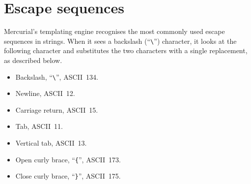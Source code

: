 
\section{Escape sequences}
\label{sec:template:escape}

Mercurial's templating engine recognises the most commonly used escape
sequences in strings.  When it sees a backslash (``\Verb+\+'')
character, it looks at the following character and substitutes the two
characters with a single replacement, as described below.

\begin{itemize}
\item[\Verb+\textbackslash\textbackslash+] Backslash, ``\Verb+\+'',
  ASCII~134.
\item[\Verb+\textbackslash n+] Newline, ASCII~12.
\item[\Verb+\textbackslash r+] Carriage return, ASCII~15.
\item[\Verb+\textbackslash t+] Tab, ASCII~11.
\item[\Verb+\textbackslash v+] Vertical tab, ASCII~13.
\item[\Verb+\textbackslash \{+] Open curly brace, ``\Verb+{+'', ASCII~173.
\item[\Verb+\textbackslash \}+] Close curly brace, ``\Verb+}+'', ASCII~175.
\end{itemize}

